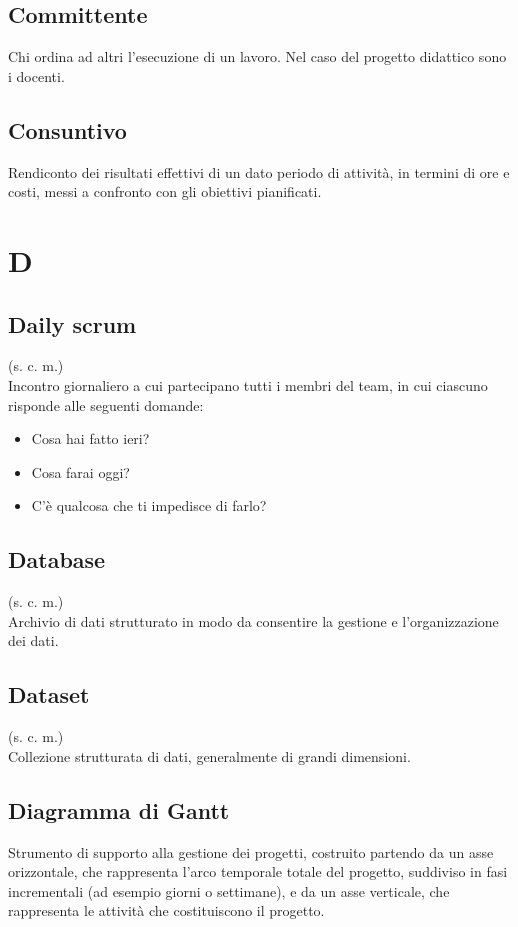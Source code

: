     \subsection{Committente}
    Chi ordina ad altri l'esecuzione di un lavoro. Nel caso del progetto didattico
    sono i docenti.
    \subsection{Consuntivo}
    Rendiconto dei risultati effettivi di un dato periodo di attività, 
    in termini di ore e costi, messi a confronto con gli obiettivi pianificati.
\pagebreak
\section{D}
    \subsection{Daily scrum}
    (s. c. m.)\\
    Incontro giornaliero a cui partecipano tutti i membri del team, in cui ciascuno
    risponde alle seguenti domande:
    \begin{itemize}
        \item Cosa hai fatto ieri?
        \item Cosa farai oggi?
        \item C'è qualcosa che ti impedisce di farlo?
    \end{itemize}
    \subsection{Database}
    (s. c. m.)\\
    Archivio di dati strutturato in modo da consentire la gestione e 
    l'organizzazione dei dati.
    \subsection{Dataset}
    (s. c. m.)\\
    Collezione strutturata di dati, generalmente di grandi dimensioni.
    \subsection{Diagramma di Gantt}
    Strumento di supporto alla gestione dei progetti, costruito partendo da 
    un asse orizzontale, che rappresenta l'arco temporale totale del progetto, 
    suddiviso in fasi incrementali (ad esempio giorni o settimane), e da un asse 
    verticale, che rappresenta le attività che costituiscono il progetto.
